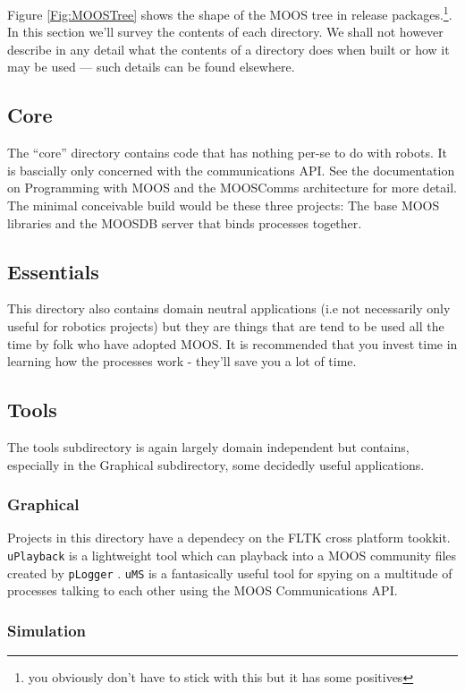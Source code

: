 \documentclass[a4paper,10pt]{article}
\newcommand{\Code}[1]{\texttt{#1} }
\newcommand{\code}[1]{\Code{#1} }
\begin{document}
Figure \ref{Fig:MOOSTree} shows the shape of the MOOS tree in
release packages.\footnote{you obviously don't have to stick with
this but it has some positives}. In this section we'll survey the contents of each directory. We shall not however describe in any detail what the contents of a directory does when built or how it may be used --- such details can be found elsewhere.

\subsection{Core}

The ``core'' directory contains
code that has nothing per-se to do with robots. It is bascially only
concerned with the communications API. See the documentation on Programming with MOOS and 
the MOOSComms architecture for more detail. The minimal conceivable build would be these three projects:
The base MOOS libraries and the MOOSDB server that binds processes
together.


\subsection{Essentials}
This directory also contains domain neutral applications (i.e not necessarily only useful for robotics projects) but they are things that are tend to be used all the time by folk who have adopted MOOS. It is recommended that you invest time in learning how the processes work - they'll save you a lot of time.

\subsection{Tools}

The tools subdirectory is again largely domain independent but contains, especially in the Graphical subdirectory, some decidedly useful
applications.

\subsubsection{Graphical}
Projects in this directory have a dependecy on the FLTK cross platform tookkit. \code{uPlayback} is a lightweight tool which can playback into a MOOS community files created by \code{pLogger}. \code{uMS} is a fantasically useful tool for spying on a multitude of processes talking to each other using the MOOS Communications API.


\subsubsection{Simulation}
\end{document}
